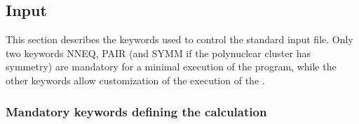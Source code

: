 \subsection{Input}
\label{UG:sec:poly_aniso_input}
This section describes the keywords used to control the standard input file.
Only two keywords NNEQ, PAIR (and SYMM if the polynuclear cluster has symmetry) are
mandatory for a minimal execution of the program, while the other keywords allow
customization of the execution of the .

\subsubsection{Mandatory keywords defining the calculation}

